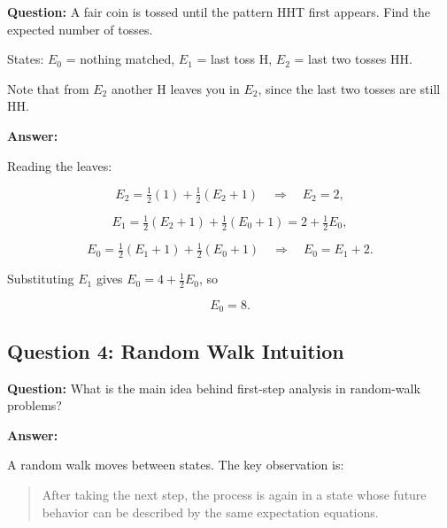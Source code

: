 \documentclass{article}
\begin{document}
\textbf{Question:}
A fair coin is tossed until the pattern HHT first appears. Find the expected number of tosses.

States: $E_0$ = nothing matched, $E_1$ = last toss H, $E_2$ = last two tosses HH.

\begin{center}
\end{center}

Note that from $E_2$ another H leaves you in $E_2$, since the last two tosses are still HH.

\textbf{Answer:}

Reading the leaves:

\[
E_2=\tfrac12(1)+\tfrac12(E_2+1)\quad\Rightarrow\quad E_2=2,
\]

\[
E_1=\tfrac12(E_2+1)+\tfrac12(E_0+1)=2+\tfrac12E_0,
\]

\[
E_0=\tfrac12(E_1+1)+\tfrac12(E_0+1)\quad\Rightarrow\quad E_0=E_1+2.
\]

Substituting $E_1$ gives $E_0=4+\tfrac12E_0$, so

\[
\boxed{E_0=8}.
\]

\subsection*{Question 4: Random Walk Intuition}

\textbf{Question:}
What is the main idea behind first-step analysis in random-walk problems?

\textbf{Answer:}

A random walk moves between states. The key observation is:

\begin{quote}
After taking the next step, the process is again in a state whose future behavior can be described by the same expectation equations.
\end{quote}
\end{document}
